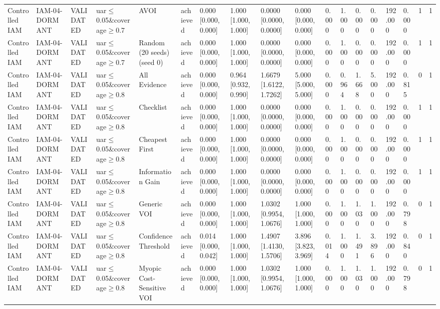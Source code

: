 \begin{table}[!ht]
{\begin{tabular}{llllllllllllllllll}
Controlled IAM & IAM-04-DORMANT & VALIDATED & uar$\le$0.05\&coverage$\ge$0.7 & AVOI & achieved & 0.000 [0.000, 0.000] & 1.000 [1.000, 1.000] & 0.0000 [0.0000, 0.0000] & 0.000 [0.000, 0.000] & 0.000 & 1.000 & 0.000 & 0.000 & 192.000 & 0.000 & 1 & 1 \\
Controlled IAM & IAM-04-DORMANT & VALIDATED & uar$\le$0.05\&coverage$\ge$0.7 & Random (20 seeds) (seed 0) & achieved & 0.000 [0.000, 0.000] & 1.000 [1.000, 1.000] & 0.0000 [0.0000, 0.0000] & 0.000 [0.000, 0.000] & 0.000 & 1.000 & 0.000 & 0.000 & 192.000 & 0.000 & 1 & 1 \\
Controlled IAM & IAM-04-DORMANT & VALIDATED & uar$\le$0.05\&coverage$\ge$0.8 & All Evidence & achieved & 0.000 [0.000, 0.000] & 0.964 [0.932, 0.990] & 1.6679 [1.6122, 1.7262] & 5.000 [5.000, 5.000] & 0.000 & 0.964 & 1.668 & 5.000 & 192.000 & 0.815 & 0 & 1 \\
Controlled IAM & IAM-04-DORMANT & VALIDATED & uar$\le$0.05\&coverage$\ge$0.8 & Checklist & achieved & 0.000 [0.000, 0.000] & 1.000 [1.000, 1.000] & 0.0000 [0.0000, 0.0000] & 0.000 [0.000, 0.000] & 0.000 & 1.000 & 0.000 & 0.000 & 192.000 & 0.000 & 1 & 1 \\
Controlled IAM & IAM-04-DORMANT & VALIDATED & uar$\le$0.05\&coverage$\ge$0.8 & Cheapest First & achieved & 0.000 [0.000, 0.000] & 1.000 [1.000, 1.000] & 0.0000 [0.0000, 0.0000] & 0.000 [0.000, 0.000] & 0.000 & 1.000 & 0.000 & 0.000 & 192.000 & 0.000 & 1 & 1 \\
Controlled IAM & IAM-04-DORMANT & VALIDATED & uar$\le$0.05\&coverage$\ge$0.8 & Information Gain & achieved & 0.000 [0.000, 0.000] & 1.000 [1.000, 1.000] & 0.0000 [0.0000, 0.0000] & 0.000 [0.000, 0.000] & 0.000 & 1.000 & 0.000 & 0.000 & 192.000 & 0.000 & 1 & 1 \\
Controlled IAM & IAM-04-DORMANT & VALIDATED & uar$\le$0.05\&coverage$\ge$0.8 & Generic VOI & achieved & 0.000 [0.000, 0.000] & 1.000 [1.000, 1.000] & 1.0302 [0.9954, 1.0676] & 1.000 [1.000, 1.000] & 0.000 & 1.000 & 1.030 & 1.000 & 192.000 & 0.798 & 0 & 1 \\
Controlled IAM & IAM-04-DORMANT & VALIDATED & uar$\le$0.05\&coverage$\ge$0.8 & Confidence Threshold & achieved & 0.014 [0.000, 0.042] & 1.000 [1.000, 1.000] & 1.4907 [1.4130, 1.5706] & 3.896 [3.823, 3.969] & 0.014 & 1.000 & 1.491 & 3.896 & 192.000 & 0.840 & 0 & 1 \\
Controlled IAM & IAM-04-DORMANT & VALIDATED & uar$\le$0.05\&coverage$\ge$0.8 & Myopic Cost-Sensitive VOI & achieved & 0.000 [0.000, 0.000] & 1.000 [1.000, 1.000] & 1.0302 [0.9954, 1.0676] & 1.000 [1.000, 1.000] & 0.000 & 1.000 & 1.030 & 1.000 & 192.000 & 0.798 & 0 & 1 \\

\end{tabular}}
\end{table}
